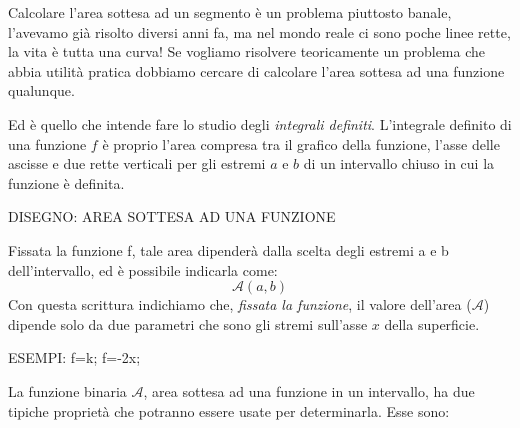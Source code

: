 Calcolare l'area sottesa ad un segmento è un problema piuttosto banale, 
l'avevamo già risolto diversi anni fa, ma nel mondo reale ci sono poche 
linee rette, la vita è tutta una curva!
Se vogliamo risolvere teoricamente un problema che abbia utilità pratica 
dobbiamo cercare di calcolare l'area sottesa ad una funzione qualunque.

Ed è quello che intende fare lo studio degli \emph{integrali definiti}.
L'integrale definito di una funzione \(f\) è proprio
l'area compresa tra il grafico della funzione, l'asse delle ascisse 
e due rette verticali per gli estremi \(a\) e \(b\) di un intervallo chiuso 
in cui la funzione è definita.

DISEGNO: AREA SOTTESA AD UNA FUNZIONE %

Fissata la funzione f, tale area dipenderà dalla scelta degli estremi a e b 
dell'intervallo, ed è possibile indicarla come: 
\[\mathcal{A}(a,b)\]
Con questa scrittura indichiamo che, \emph{fissata la funzione}, il valore 
dell'area (\(\mathcal{A}\)) dipende solo da due parametri che sono gli 
stremi sull'asse \(x\) della superficie.


ESEMPI: f=k; f=-2x; %

La funzione binaria \(\mathcal{A}\), area sottesa ad una funzione in un 
intervallo, ha due tipiche proprietà che potranno essere usate per 
determinarla. Esse sono: 

